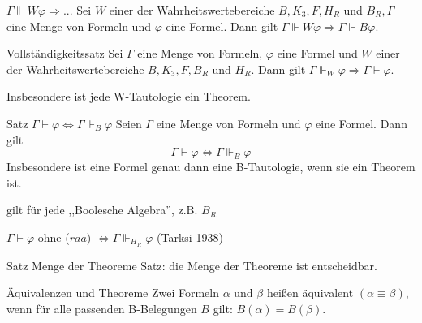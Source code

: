 \documentclass[avery5371]{flashcards}
\begin{document}
\begin{flashcard}{ $\Gamma\Vdash W\varphi\Rightarrow...$ }
    Sei $W$ einer der Wahrheitswertebereiche $B, K_3, F, H_R$ und $B_R,\Gamma$ eine Menge von Formeln und $\varphi$ eine Formel. Dann gilt $\Gamma\Vdash W\varphi\Rightarrow\Gamma\Vdash B\varphi$.
\end{flashcard}

\begin{flashcard}{ Vollständigkeitssatz }
    Sei $\Gamma$ eine Menge von Formeln, $\varphi$ eine Formel und $W$ einer der Wahrheitswertebereiche $B,K_3 , F, B_R$ und $H_R$. Dann gilt $\Gamma\Vdash_W\varphi \Rightarrow \Gamma\vdash\varphi$.

    Insbesondere ist jede W-Tautologie ein Theorem.
\end{flashcard}

\begin{flashcard}{ Satz $\Gamma\vdash\varphi\Leftrightarrow\Gamma\Vdash_B \varphi$}
    Seien $\Gamma$ eine Menge von Formeln und $\varphi$ eine Formel. Dann gilt $$\Gamma\vdash\varphi\Leftrightarrow\Gamma\Vdash_B \varphi$$
    Insbesondere ist eine Formel genau dann eine B-Tautologie, wenn sie ein Theorem ist.
    \begin{itemize*}
        \item gilt für jede ,,Boolesche Algebra'', z.B. $B_R$
        \item $\Gamma\vdash\varphi$ ohne ($raa$) $\Leftrightarrow\Gamma\Vdash_{H_R} \varphi$ (Tarksi 1938)
    \end{itemize*}
\end{flashcard}

\begin{flashcard}[ Entscheidbarkeit ]{ Satz Menge der Theoreme }
    Satz: die Menge der Theoreme ist entscheidbar.
\end{flashcard}

\begin{flashcard}{ Äquivalenzen und Theoreme }
    Zwei Formeln $\alpha$ und $\beta$ heißen äquivalent $(\alpha\equiv\beta)$, wenn für alle passenden B-Belegungen $B$ gilt: $B(\alpha) =B(\beta)$.
\end{flashcard}
\end{document}

